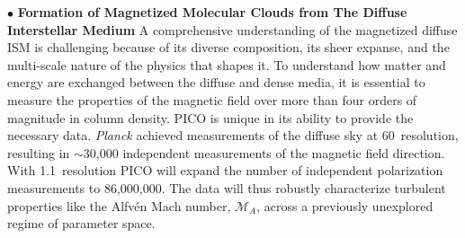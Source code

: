 \documentclass[PICOReport.tex]{subfiles}
\begin{document}


\noindent$\bullet$ {\bf Formation of Magnetized Molecular Clouds from The Diffuse Interstellar Medium} \hspace{0.1in}
A comprehensive understanding of the magnetized diffuse \ac{ISM} is challenging because of its diverse composition, its sheer expanse, and the multi-scale nature of the physics that shapes it. To understand how matter and energy are exchanged between the diffuse and dense media, it is essential to measure the properties of the magnetic field over more than four orders of magnitude in column density. PICO is unique in its ability to provide the necessary data. \textit{Planck} achieved measurements of the diffuse sky at 60\arcmin\ resolution, resulting in $\sim$30,000 independent measurements of the magnetic field direction.  With 1.1\arcmin~resolution PICO will expand the number of independent polarization measurements to 86,000,000. The data will thus robustly characterize turbulent properties like the Alfv\'{e}n Mach number, $\mathcal{M}_A$, across a previously unexplored regime of parameter space. 
\end{document}
